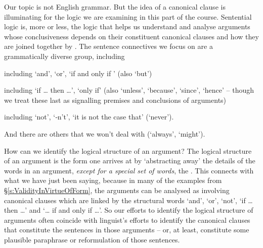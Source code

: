 Our topic is not English grammar. But the idea of a canonical clause is illuminating for the logic we are examining in this part of the course. Sentential logic is, more or less, the logic that helps us understand and analyse arguments whose conclusiveness depends on their constituent canonical clauses and how they are joined together by . The sentence connectives we focus on are a grammatically diverse group, including \begin{description}
	\item[Coordinators] including ‘and’, ‘or’, ‘if and only if ’ (also ‘but’)\item[Adjunct heads] including ‘if … then …’, ‘only if’ (also ‘unless’, ‘because’, ‘since’, ‘hence’ – though we treat these last as signalling premises and conclusions of arguments)
	\item[Negatives] including ‘not’, ‘‐n’t’, ‘it is not the case that’ (‘never’).
	\item And there are others that we won’t deal with (‘always’, ‘might’).
\end{description}


How can we identify the logical structure of an argument? The logical structure of an argument is the form one arrives at by `abstracting away' the details of the words in an argument, \emph{except for a special set of words}, the . This connects with what we have just been saying, because in many of the examples from §\ref{s:ValidityInVirtueOfForm}, the arguments can be analysed as involving canonical clauses which are linked by the structural words `and', `or', `not', `if … then …' and `… if and only if …'. So our efforts to identify the logical structure of arguments often coincide with linguist's efforts to identify the canonical clauses that constitute the sentences in those arguments – or, at least, constitute some plausible paraphrase or reformulation of those sentences.

